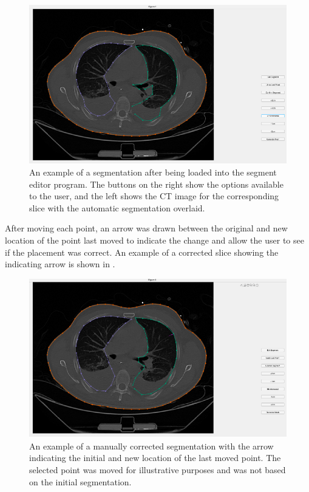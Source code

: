 \begin{figure}[H]
	\centering
	\includegraphics[width=\textwidth]{chapter5-CT_to_mesh/imgs/SegmentationAppLoaded.pdf}
	\caption[Manual segmentation interface with initial input]{\label{fig:seg-app-loaded}%
	An example of a segmentation after being loaded into the segment editor program. 
	The buttons on the right show the options available to the user, and the left shows the 
	CT image for the corresponding slice with the automatic segmentation overlaid.
	}
\end{figure}

After moving each point, an arrow was drawn between the original and new location of the
point last moved to indicate the change and allow the user to see if the
placement was correct. An example of a corrected slice showing the indicating arrow 
is shown in .

\begin{figure}[H]
	\centering
	\includegraphics[width=\textwidth]{chapter5-CT_to_mesh/imgs/SegmentationAppCorrected.pdf}
	\caption[Manually corrected segmentation]{\label{fig:seg-app-corrected}%
	An example of a manually corrected segmentation with the arrow indicating the initial
	and new location of the last moved point. The selected point was moved for illustrative
	purposes and was not based on the initial segmentation.}
\end{figure}

